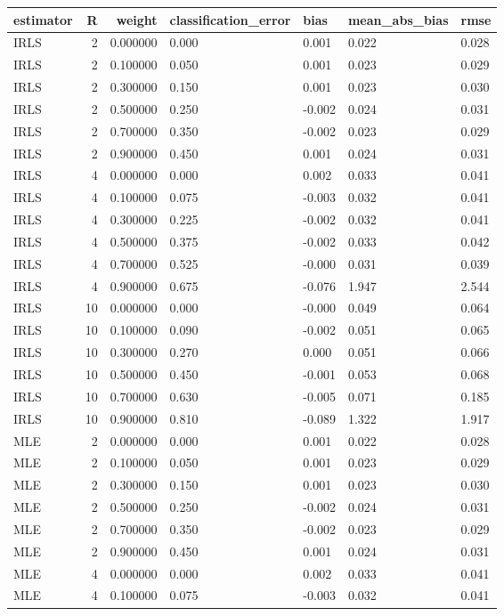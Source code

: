 \begin{tabular}{lrrllll}
\toprule
estimator & R & weight & classification\_error & bias & mean\_abs\_bias & rmse \\
\midrule
IRLS & 2 & 0.000000 & 0.000 & 0.001 & 0.022 & 0.028 \\
IRLS & 2 & 0.100000 & 0.050 & 0.001 & 0.023 & 0.029 \\
IRLS & 2 & 0.300000 & 0.150 & 0.001 & 0.023 & 0.030 \\
IRLS & 2 & 0.500000 & 0.250 & -0.002 & 0.024 & 0.031 \\
IRLS & 2 & 0.700000 & 0.350 & -0.002 & 0.023 & 0.029 \\
IRLS & 2 & 0.900000 & 0.450 & 0.001 & 0.024 & 0.031 \\
IRLS & 4 & 0.000000 & 0.000 & 0.002 & 0.033 & 0.041 \\
IRLS & 4 & 0.100000 & 0.075 & -0.003 & 0.032 & 0.041 \\
IRLS & 4 & 0.300000 & 0.225 & -0.002 & 0.032 & 0.041 \\
IRLS & 4 & 0.500000 & 0.375 & -0.002 & 0.033 & 0.042 \\
IRLS & 4 & 0.700000 & 0.525 & -0.000 & 0.031 & 0.039 \\
IRLS & 4 & 0.900000 & 0.675 & -0.076 & 1.947 & 2.544 \\
IRLS & 10 & 0.000000 & 0.000 & -0.000 & 0.049 & 0.064 \\
IRLS & 10 & 0.100000 & 0.090 & -0.002 & 0.051 & 0.065 \\
IRLS & 10 & 0.300000 & 0.270 & 0.000 & 0.051 & 0.066 \\
IRLS & 10 & 0.500000 & 0.450 & -0.001 & 0.053 & 0.068 \\
IRLS & 10 & 0.700000 & 0.630 & -0.005 & 0.071 & 0.185 \\
IRLS & 10 & 0.900000 & 0.810 & -0.089 & 1.322 & 1.917 \\
MLE & 2 & 0.000000 & 0.000 & 0.001 & 0.022 & 0.028 \\
MLE & 2 & 0.100000 & 0.050 & 0.001 & 0.023 & 0.029 \\
MLE & 2 & 0.300000 & 0.150 & 0.001 & 0.023 & 0.030 \\
MLE & 2 & 0.500000 & 0.250 & -0.002 & 0.024 & 0.031 \\
MLE & 2 & 0.700000 & 0.350 & -0.002 & 0.023 & 0.029 \\
MLE & 2 & 0.900000 & 0.450 & 0.001 & 0.024 & 0.031 \\
MLE & 4 & 0.000000 & 0.000 & 0.002 & 0.033 & 0.041 \\
MLE & 4 & 0.100000 & 0.075 & -0.003 & 0.032 & 0.041 \\

\end{tabular}
